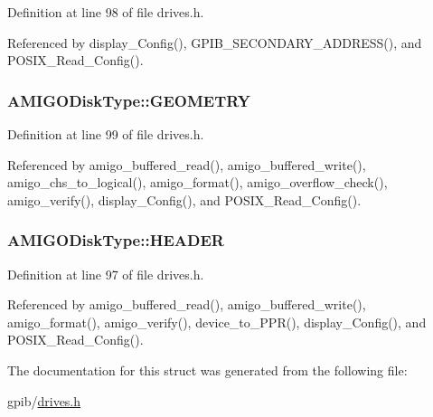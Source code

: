Definition at line 98 of file drives.\+h.



Referenced by display\+\_\+\+Config(), G\+P\+I\+B\+\_\+\+S\+E\+C\+O\+N\+D\+A\+R\+Y\+\_\+\+A\+D\+D\+R\+E\+S\+S(), and P\+O\+S\+I\+X\+\_\+\+Read\+\_\+\+Config().

\subsubsection[{\texorpdfstring{G\+E\+O\+M\+E\+T\+RY}{GEOMETRY}}]{ A\+M\+I\+G\+O\+Disk\+Type\+::\+G\+E\+O\+M\+E\+T\+RY}\hypertarget{structAMIGODiskType_aa75cfbfabf8081ff7bca08cf87af4da8}{}\label{structAMIGODiskType_aa75cfbfabf8081ff7bca08cf87af4da8}


Definition at line 99 of file drives.\+h.



Referenced by amigo\+\_\+buffered\+\_\+read(), amigo\+\_\+buffered\+\_\+write(), amigo\+\_\+chs\+\_\+to\+\_\+logical(), amigo\+\_\+format(), amigo\+\_\+overflow\+\_\+check(), amigo\+\_\+verify(), display\+\_\+\+Config(), and P\+O\+S\+I\+X\+\_\+\+Read\+\_\+\+Config().

\subsubsection[{\texorpdfstring{H\+E\+A\+D\+ER}{HEADER}}]{ A\+M\+I\+G\+O\+Disk\+Type\+::\+H\+E\+A\+D\+ER}\hypertarget{structAMIGODiskType_a9814efe6f564b104fc7e0100231908a8}{}\label{structAMIGODiskType_a9814efe6f564b104fc7e0100231908a8}


Definition at line 97 of file drives.\+h.



Referenced by amigo\+\_\+buffered\+\_\+read(), amigo\+\_\+buffered\+\_\+write(), amigo\+\_\+format(), amigo\+\_\+verify(), device\+\_\+to\+\_\+\+P\+P\+R(), display\+\_\+\+Config(), and P\+O\+S\+I\+X\+\_\+\+Read\+\_\+\+Config().



The documentation for this struct was generated from the following file\+:\begin{DoxyCompactItemize}
\item 
gpib/\hyperlink{drives_8h}{drives.\+h}\end{DoxyCompactItemize}
